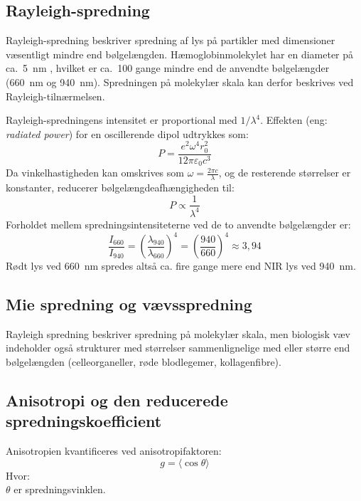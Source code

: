 \subsection{Rayleigh-spredning}
Rayleigh-spredning beskriver spredning af lys på partikler med dimensioner væsentligt mindre end bølgelængden. Hæmoglobinmolekylet har en diameter på ca.\ \SI{5}{nm} \parencite{Erickson2009}, hvilket er ca.\ 100 gange mindre end de anvendte bølgelængder (\SI{660}{nm} og \SI{940}{nm}). Spredningen på molekylær skala kan derfor beskrives ved Rayleigh-tilnærmelsen.

Rayleigh-spredningens intensitet er proportional med $1/\lambda^4$. Effekten (eng: \textit{radiated power}) for en oscillerende dipol udtrykkes som:
\begin{equation}
    P = \frac{e^2 \omega^4 r_0^2}{12\pi \varepsilon_0 c^3}
    \label{eq:rayleigh_full}
\end{equation}
Da vinkelhastigheden kan omskrives som $\omega = \frac{2\pi c}{\lambda}$, og de resterende størrelser er konstanter, reducerer bølgelængdeafhængigheden til:
\begin{equation}
    P \propto \frac{1}{\lambda^4}
    \label{eq:rayleigh_prop}
\end{equation}
Forholdet mellem spredningsintensiteterne ved de to anvendte bølgelængder er:
\begin{equation}
    \frac{I_{660}}{I_{940}} = \left(\frac{\lambda_{940}}{\lambda_{660}}\right)^4 
    = \left(\frac{940}{660}\right)^4 \approx 3{,}94
    \label{eq:rayleigh_ratio}
\end{equation}
Rødt lys ved \SI{660}{nm} spredes altså ca. fire gange mere end NIR lys ved \SI{940}{nm}. 

\subsection{Mie spredning og vævsspredning}
Rayleigh spredning beskriver spredning på molekylær skala, men biologisk væv indeholder også strukturer med størrelser sammenlignelige med eller større end bølgelængden (celleorganeller, røde blodlegemer, kollagenfibre). 

\subsection{Anisotropi og den reducerede spredningskoefficient}
Anisotropien kvantificeres ved anisotropifaktoren:
\begin{equation}
    g = \langle \cos \theta \rangle
    \label{eq:anisotropy}
\end{equation}
Hvor: \\
$\theta$ er spredningsvinklen. \\ 

